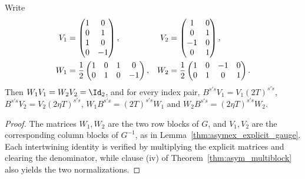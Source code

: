 \begin{lemma}
    \label{thm:asymex_kw_intertwiners}
    \leanok
    Write
    \begin{align}
        V_1 & =\begin{pmatrix}
                   1 & 0  \\
                   0 & 1  \\
                   1 & 0  \\
                   0 & -1
               \end{pmatrix},
            & V_2
            & =\begin{pmatrix}
                   1  & 0 \\
                   0  & 1 \\
                   -1 & 0 \\
                   0  & 1
               \end{pmatrix},
        \notag                       \\
        W_1 & =\frac12\begin{pmatrix}
                          1 & 0 & 1 & 0  \\
                          0 & 1 & 0 & -1
                      \end{pmatrix},
            & W_2
            & =\frac12\begin{pmatrix}
                          1 & 0 & -1 & 0 \\
                          0 & 1 & 0  & 1
                      \end{pmatrix}.
        \notag
    \end{align}
    Then $W_1V_1=W_2V_2=\Id_2$, and for every index pair,
    $B^{s's}V_1=V_1(2T)^{s's}$, $B^{s's}V_2=V_2(2\eta T)^{s's}$,
    $W_1B^{s's}=(2T)^{s's}W_1$ and $W_2B^{s's}=(2\eta T)^{s's}W_2$.
\end{lemma}

\begin{proof}
    \leanok
    The matrices $W_1,W_2$ are the two row blocks of $G$, and $V_1,V_2$
    are the corresponding column blocks of $G^{-1}$, as in
    Lemma~\ref{thm:asymex_explicit_gauge}. Each intertwining identity
    is verified by multiplying the explicit matrices and clearing the
    denominator, while clause (iv) of Theorem~\ref{thm:asym_multiblock}
    also yields the two normalizations.
\end{proof}

